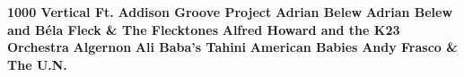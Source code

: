 \noindent \textbf{1000 Vertical Ft.}\newline
\vspace{10pt} 
\newline
\vspace{10pt} 
\noindent \textbf{Addison Groove Project}\newline
\vspace{10pt} 
\newline
\vspace{10pt} 
\noindent \textbf{Adrian Belew}\newline
\vspace{10pt} 
\newline
\vspace{10pt} 
\noindent \textbf{Adrian Belew and B\'ela Fleck \& The Flecktones}\newline
\vspace{10pt} 
\newline
\vspace{10pt} 
\noindent \textbf{Alfred Howard and the K23 Orchestra}\newline
\vspace{10pt} 
\newline
\vspace{10pt} 
\noindent \textbf{Algernon}\newline
\vspace{10pt} 
\newline
\vspace{10pt} 
\noindent \textbf{Ali Baba's Tahini}\newline
\vspace{10pt} 
\newline
\vspace{10pt} 
\noindent \textbf{American Babies}\newline
\vspace{10pt} 
\newline
\vspace{10pt} 
\noindent \textbf{Andy Frasco \& The U.N.}\newline
\vspace{10pt} 
\newline
\vspace{10pt} 
